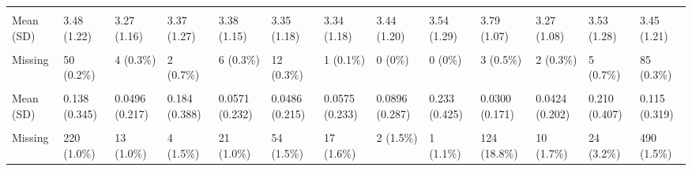 \documentclass[
  single column]{article}
\begin{document}
\begin{landscape}
\begin{longtable}[t]{lllllllllllll}
\cellcolor{gray!10}{Neuroticism (Personality Trait)} & \cellcolor{gray!10}{} & \cellcolor{gray!10}{} & \cellcolor{gray!10}{} & \cellcolor{gray!10}{} & \cellcolor{gray!10}{} & \cellcolor{gray!10}{} & \cellcolor{gray!10}{} & \cellcolor{gray!10}{} & \cellcolor{gray!10}{} & \cellcolor{gray!10}{} & \cellcolor{gray!10}{} & \cellcolor{gray!10}{}\\
\addlinespace
Mean (SD) & 3.48 (1.22) & 3.27 (1.16) & 3.37 (1.27) & 3.38 (1.15) & 3.35 (1.18) & 3.34 (1.18) & 3.44 (1.20) & 3.54 (1.29) & 3.79 (1.07) & 3.27 (1.08) & 3.53 (1.28) & 3.45 (1.21)\\
\cellcolor{gray!10}{Median [Min, Max]} & \cellcolor{gray!10}{3.50 [1.00, 7.00]} & \cellcolor{gray!10}{3.25 [1.00, 7.00]} & \cellcolor{gray!10}{3.25 [1.00, 7.00]} & \cellcolor{gray!10}{3.25 [1.00, 7.00]} & \cellcolor{gray!10}{3.25 [1.00, 7.00]} & \cellcolor{gray!10}{3.25 [1.00, 7.00]} & \cellcolor{gray!10}{3.29 [1.00, 7.00]} & \cellcolor{gray!10}{3.50 [1.00, 6.50]} & \cellcolor{gray!10}{3.75 [1.00, 7.00]} & \cellcolor{gray!10}{3.25 [1.00, 7.00]} & \cellcolor{gray!10}{3.50 [1.00, 7.00]} & \cellcolor{gray!10}{3.50 [1.00, 7.00]}\\
Missing & 50 (0.2\%) & 4 (0.3\%) & 2 (0.7\%) & 6 (0.3\%) & 12 (0.3\%) & 1 (0.1\%) & 0 (0\%) & 0 (0\%) & 3 (0.5\%) & 2 (0.3\%) & 5 (0.7\%) & 85 (0.3\%)\\
\cellcolor{gray!10}{Non-Heterosexual Orientation (Yes/No)} & \cellcolor{gray!10}{} & \cellcolor{gray!10}{} & \cellcolor{gray!10}{} & \cellcolor{gray!10}{} & \cellcolor{gray!10}{} & \cellcolor{gray!10}{} & \cellcolor{gray!10}{} & \cellcolor{gray!10}{} & \cellcolor{gray!10}{} & \cellcolor{gray!10}{} & \cellcolor{gray!10}{} & \cellcolor{gray!10}{}\\
Mean (SD) & 0.138 (0.345) & 0.0496 (0.217) & 0.184 (0.388) & 0.0571 (0.232) & 0.0486 (0.215) & 0.0575 (0.233) & 0.0896 (0.287) & 0.233 (0.425) & 0.0300 (0.171) & 0.0424 (0.202) & 0.210 (0.407) & 0.115 (0.319)\\
\addlinespace
\cellcolor{gray!10}{Median [Min, Max]} & \cellcolor{gray!10}{0 [0, 1.00]} & \cellcolor{gray!10}{0 [0, 1.00]} & \cellcolor{gray!10}{0 [0, 1.00]} & \cellcolor{gray!10}{0 [0, 1.00]} & \cellcolor{gray!10}{0 [0, 1.00]} & \cellcolor{gray!10}{0 [0, 1.00]} & \cellcolor{gray!10}{0 [0, 1.00]} & \cellcolor{gray!10}{0 [0, 1.00]} & \cellcolor{gray!10}{0 [0, 1.00]} & \cellcolor{gray!10}{0 [0, 1.00]} & \cellcolor{gray!10}{0 [0, 1.00]} & \cellcolor{gray!10}{0 [0, 1.00]}\\
Missing & 220 (1.0\%) & 13 (1.0\%) & 4 (1.5\%) & 21 (1.0\%) & 54 (1.5\%) & 17 (1.6\%) & 2 (1.5\%) & 1 (1.1\%) & 124 (18.8\%) & 10 (1.7\%) & 24 (3.2\%) & 490 (1.5\%)\\

\end{longtable}
\end{landscape}
\end{document}

